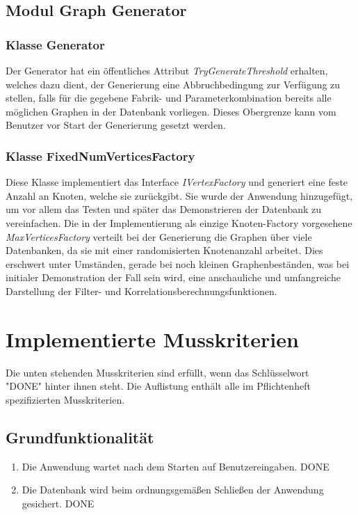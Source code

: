 \documentclass[13pt]{scrreprt}
\newcounter{tempcounter1}
\newcounter{tempcounter2}
\newcounter{tempcounter3}
\newcounter{tempcounter4}
\newcounter{tempcounter5}
\newcounter{tempcounter6}
\newcounter{tempcounter7}
\newcounter{tempcounter8}
\newcounter{tempcounter9}
\begin{document}
\section{Modul Graph Generator}
	\subsection{Klasse Generator}
	Der Generator hat ein öffentliches Attribut \textit{TryGenerateThreshold} erhalten, welches dazu dient, der Generierung eine Abbruchbedingung zur Verfügung zu stellen, falls für die gegebene Fabrik- und Parameterkombination bereits alle möglichen Graphen in der Datenbank vorliegen. Dieses Obergrenze kann vom Benutzer vor Start der Generierung gesetzt werden.
	
	\newpage
	\subsection{Klasse FixedNumVerticesFactory}
	Diese Klasse implementiert das Interface \textit{IVertexFactory}  und generiert eine feste Anzahl an Knoten, welche sie zurückgibt. Sie wurde der Anwendung hinzugefügt, um vor allem das Testen und später das Demonstrieren der Datenbank zu vereinfachen. Die in der Implementierung als einzige Knoten-Factory vorgesehene \textit{MaxVerticesFactory} verteilt bei der Generierung die Graphen über viele Datenbanken, da sie mit einer randomisierten Knotenanzahl arbeitet. Dies erschwert unter Umständen, gerade bei noch kleinen Graphenbeständen, was bei initialer Demonstration der Fall sein wird, eine anschauliche und umfangreiche Darstellung der Filter- und Korrelationsberechnungsfunktionen.
	

\chapter{Implementierte Musskriterien}
Die unten stehenden Musskriterien sind erfüllt, wenn das Schlüsselwort \\ "DONE" hinter ihnen steht.
Die Auflistung enthält alle im Pflichtenheft spezifizierten Musskriterien.
\section{Grundfunktionalität}
\begin{addmargin}[25pt]{0pt}
	\begin{enumerate} [label=FA\arabic*,start=100]
		\item \label{FA100}Die Anwendung wartet nach dem Starten auf Benutzereingaben. DONE
		\item \label{FA101}Die Datenbank wird beim ordnungsgemäßen Schließen der Anwendung gesichert. DONE
		\setcounter{tempcounter3}{\value{enumi}}
	\end{enumerate}
\end{addmargin}
\end{document}
